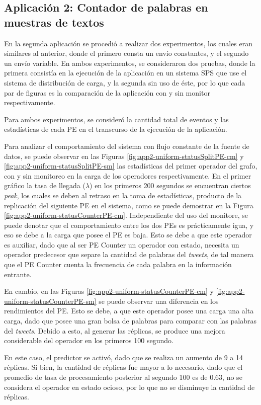 \subsection{Aplicación 2: Contador de palabras en muestras de textos}
En la segunda aplicación se procedió a realizar dos experimentos, los cuales eran similares al anterior, donde el primero consta un envío constantes, y el segundo un envío variable. En ambos experimentos, se consideraron dos pruebas, donde la primera consistía en la ejecución de la aplicación en un sistema SPS que use el sistema de distribución de carga, y la segunda sin uso de éste, por lo que cada par de figuras es la comparación de la aplicación con y sin monitor respectivamente.

Para ambos experimentos, se consideró la cantidad total de eventos y las estadísticas de cada PE en el transcurso de la ejecución de la aplicación.

Para analizar el comportamiento del sistema con flujo constante de la fuente de datos, se puede observar en las Figuras \ref{fig:app2-uniform-statusSplitPE-cm} y \ref{fig:app2-uniform-statusSplitPE-sm} las estadísticas del primer operador del grafo, con y sin monitoreo en la carga de los operadores respectivamente. En el primer gráfico la tasa de llegada ($\lambda$) en los primeros 200 segundos se encuentran ciertos \textit{peak}, los cuales se deben al retraso en la toma de estadísticas, producto de la replicación del siguiente PE en el sistema, como se puede demostrar en la Figura \ref{fig:app2-uniform-statusCounterPE-cm}. Independiente del uso del monitore, se puede denotar que el comportamiento entre los dos PEs es prácticamente igua, y eso se debe a la carga que posee el PE es baja. Esto se debe a que este operador es auxiliar, dado que al ser PE Counter un operador con estado, necesita un operador predecesor que separe la cantidad de palabras del \textit{tweets}, de tal manera que el PE Counter cuenta la frecuencia de cada palabra en la información entrante.

En cambio, en las Figuras \ref{fig:app2-uniform-statusCounterPE-cm} y \ref{fig:app2-uniform-statusCounterPE-sm} se puede observar una diferencia en los rendimientos del PE. Esto se debe, a que este operador posee una carga una alta carga, dado que posee una gran bolsa de palabras para comparar con las palabras del \textit{tweets}. Debido a esto, al generar las réplicas, se produce una mejora considerable del operador en los primeros 100 segundo.

En este caso, el predictor se activó, dado que se realiza un aumento de 9 a 14 réplicas. Si bien, la cantidad de réplicas fue mayor a lo necesario, dado que el promedio de tasa de procesamiento posterior al segundo 100 es de 0.63, no se considera el operador en estado ocioso, por lo que no se disminuye la cantidad de réplicas.

